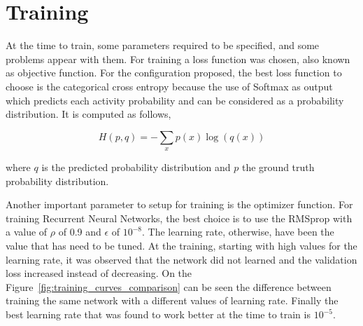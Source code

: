 


\section{Training}

At the time to train, some parameters required to be specified, and some problems appear with them. For training a loss function was chosen, also known as objective function. For the configuration proposed, the best loss function to choose is the categorical cross entropy because the use of Softmax as output which predicts each activity probability and can be considered as a probability distribution. It is computed as follows,

\begin{equation}
	H(p,q) = - \sum_x p(x) \log(q(x))
\end{equation}

where $q$ is the predicted probability distribution and $p$ the ground truth probability distribution.

Another important parameter to setup for training is the optimizer function. For training Recurrent Neural Networks, the best choice is to use the RMSprop\cite{dauphin2015rmsprop} with a value of $\rho$ of 0.9 and $\epsilon$ of $10^{-8}$. The learning rate, otherwise, have been the value that has need to be tuned. At the training, starting with high values for the learning rate, it was observed that the network did not learned and the validation loss increased instead of decreasing. On the Figure~\ref{fig:training_curves_comparison} can be seen the difference between training the same network with a different values of learning rate. Finally the best learning rate that was found to work better at the time to train is $10^{-5}$.

